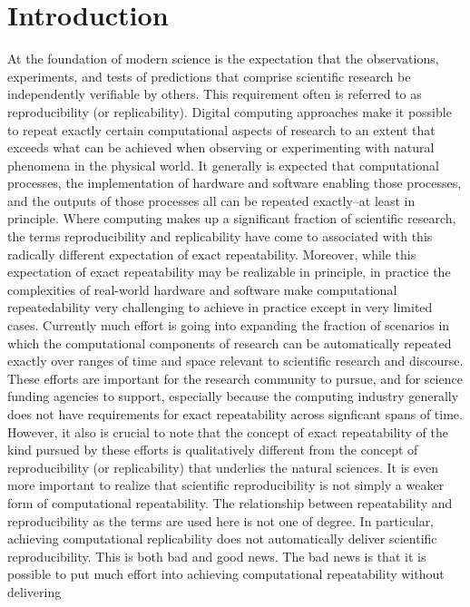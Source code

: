 \section{Introduction}

	At the foundation of modern science is the expectation that the observations, experiments, and
		tests of predictions that comprise scientific research be independently verifiable by others.
	This requirement often is referred to as reproducibility (or replicability).
	Digital computing approaches make it possible to repeat exactly certain computational aspects of research
		to an extent that exceeds what can be achieved when observing or experimenting with natural 
		phenomena in the physical world.  
	It generally is expected that computational processes, the implementation of hardware and software 
		enabling those processes, and the outputs of those processes all can be repeated exactly--at least in principle.
	Where computing makes up a significant fraction of scientific research, the terms reproducibility and
		replicability have come to associated with this radically different expectation of exact repeatability. 
	Moreover, while this expectation of exact repeatability may be realizable in principle, in practice the complexities of real-world
		hardware and software make  computational repeatedability very challenging to achieve in practice except in very limited cases.
	Currently much effort is going into expanding the fraction of scenarios in which the computational
		components of research can be automatically repeated exactly over ranges of time and space relevant to scientific 
		research and discourse.
	These efforts are important for the research community to pursue, and for science funding
		agencies to support, especially because the computing industry generally does not have 
		requirements for exact repeatability across signficant spans of time.
	However, it also is crucial to note that the concept of exact repeatability of the kind pursued by these efforts is 
		qualitatively different from the concept of reproducibility (or replicability) that underlies the natural sciences.
	It is even more important to realize that scientific reproducibility is not simply a weaker form of computational
		repeatability.  
	The relationship between repeatability and reproducibility as the terms are used here is not one of degree.
	In particular, achieving computational replicability does not automatically deliver scientific reproducibility.
	This is both bad and good news.
	The bad news is that it is possible to put much effort into achieving computational repeatability without delivering
